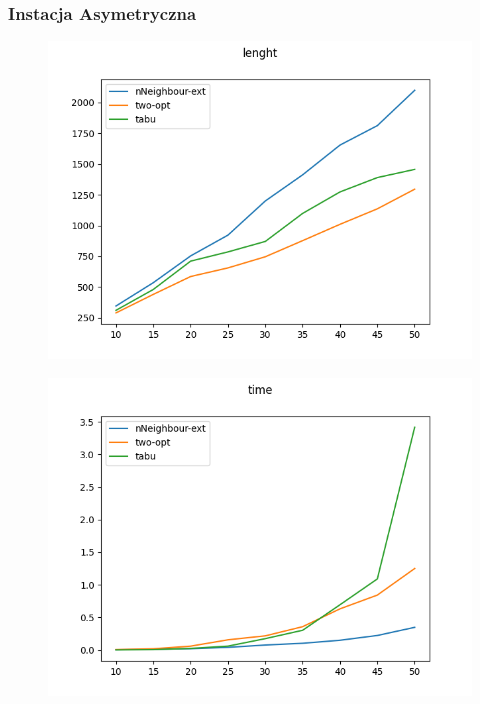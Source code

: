 \documentclass[11pt]{article}
\begin{document}
    \subsubsection{Instacja Asymetryczna}
    \begin{center}
        \begin{figure}[H]
            \includegraphics[scale=0.50]{asymetricLen.png}
        \end{figure}
    \end{center}
    \begin{center}
        \begin{figure}[H]
            \includegraphics[scale=0.50]{asymetricTime.png}\\
        \end{figure}
    \end{center}
\end{document}
